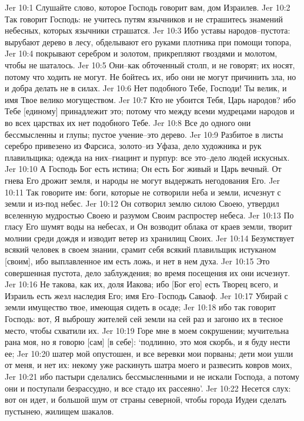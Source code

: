 Jer 10:1  Слушайте слово, которое Господь говорит вам, дом Израилев.
Jer 10:2  Так говорит Господь: не учитесь путям язычников и не страшитесь знамений небесных, которых язычники страшатся.
Jer 10:3  Ибо уставы народов--пустота: вырубают дерево в лесу, обделывают его руками плотника при помощи топора,
Jer 10:4  покрывают серебром и золотом, прикрепляют гвоздями и молотом, чтобы не шаталось.
Jer 10:5  Они--как обточенный столп, и не говорят; их носят, потому что ходить не могут. Не бойтесь их, ибо они не могут причинить зла, но и добра делать не в силах.
Jer 10:6  Нет подобного Тебе, Господи! Ты велик, и имя Твое велико могуществом.
Jer 10:7  Кто не убоится Тебя, Царь народов? ибо Тебе [единому] принадлежит это; потому что между всеми мудрецами народов и во всех царствах их нет подобного Тебе.
Jer 10:8  Все до одного они бессмысленны и глупы; пустое учение--это дерево.
Jer 10:9  Разбитое в листы серебро привезено из Фарсиса, золото--из Уфаза, дело художника и рук плавильщика; одежда на них--гиацинт и пурпур: все это--дело людей искусных.
Jer 10:10  А Господь Бог есть истина; Он есть Бог живый и Царь вечный. От гнева Его дрожит земля, и народы не могут выдержать негодования Его.
Jer 10:11  Так говорите им: боги, которые не сотворили неба и земли, исчезнут с земли и из-под небес.
Jer 10:12  Он сотворил землю силою Своею, утвердил вселенную мудростью Своею и разумом Своим распростер небеса.
Jer 10:13  По гласу Его шумят воды на небесах, и Он возводит облака от краев земли, творит молнии среди дождя и изводит ветер из хранилищ Своих.
Jer 10:14  Безумствует всякий человек в своем знании, срамит себя всякий плавильщик истуканом [своим], ибо выплавленное им есть ложь, и нет в нем духа.
Jer 10:15  Это совершенная пустота, дело заблуждения; во время посещения их они исчезнут.
Jer 10:16  Не такова, как их, доля Иакова; ибо [Бог его] есть Творец всего, и Израиль есть жезл наследия Его; имя Его--Господь Саваоф.
Jer 10:17  Убирай с земли имущество твое, имеющая сидеть в осаде;
Jer 10:18  ибо так говорит Господь: вот, Я выброшу жителей сей земли на сей раз и загоню их в тесное место, чтобы схватили их.
Jer 10:19  Горе мне в моем сокрушении; мучительна рана моя, но я говорю [сам] [в себе]: `подлинно, это моя скорбь, и я буду нести ее;
Jer 10:20  шатер мой опустошен, и все веревки мои порваны; дети мои ушли от меня, и нет их: некому уже раскинуть шатра моего и развесить ковров моих,
Jer 10:21  ибо пастыри сделались бессмысленными и не искали Господа, а потому они и поступали безрассудно, и все стадо их рассеяно'.
Jer 10:22  Несется слух: вот он идет, и большой шум от страны северной, чтобы города Иудеи сделать пустынею, жилищем шакалов.
